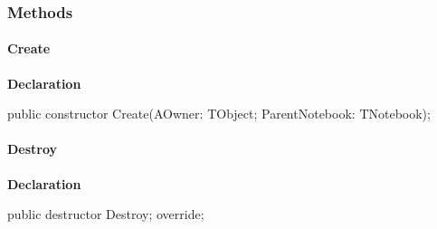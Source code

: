 \documentclass{report}
\newif\ifpdf
\begin{document}
\subsubsection*{\large{\textbf{Methods}}\normalsize\hspace{1ex}\hfill}
\paragraph*{Create}\hspace*{\fill}

\label{editor.TFileProfiles-Create}
\begin{list}{}{
\setlength{\itemindent}{0cm}
\setlength{\listparindent}{0cm}
\setlength{\leftmargin}{\evensidemargin}
\addtolength{\leftmargin}{\tmplength}
\settowidth{\labelsep}{X}
\addtolength{\leftmargin}{\labelsep}
\setlength{\labelwidth}{\tmplength}
}
\item[\textbf{Declaration}\hfill]
\ifpdf
\begin{flushleft}
\fi
\begin{ttfamily}
public constructor Create(AOwner: TObject; ParentNotebook: TNotebook);\end{ttfamily}

\ifpdf
\end{flushleft}
\fi

\end{list}
\paragraph*{Destroy}\hspace*{\fill}

\label{editor.TFileProfiles-Destroy}
\begin{list}{}{
\setlength{\itemindent}{0cm}
\setlength{\listparindent}{0cm}
\setlength{\leftmargin}{\evensidemargin}
\addtolength{\leftmargin}{\tmplength}
\settowidth{\labelsep}{X}
\addtolength{\leftmargin}{\labelsep}
\setlength{\labelwidth}{\tmplength}
}
\item[\textbf{Declaration}\hfill]
\ifpdf
\begin{flushleft}
\fi
\begin{ttfamily}
public destructor Destroy; override;\end{ttfamily}

\ifpdf
\end{flushleft}
\fi

\end{list}
\end{document}
